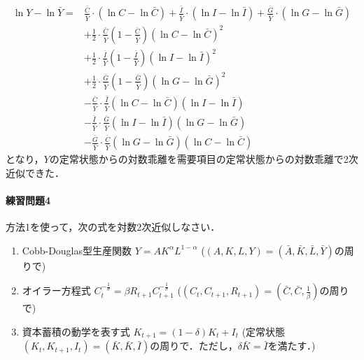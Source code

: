 \documentclass[a4paper,12pt,onecolumn,oneside,notitlepage,final]{article}
\begin{document}
\begin{itemize}
\begin{align*}
\ln Y - \ln \bar Y = &\frac{\bar C}{\bar Y}\cdot (\ln C - \ln \bar C) + \frac{\bar I}{\bar Y}\cdot (\ln I - \ln \bar I) + \frac{\bar G}{\bar Y}\cdot (\ln G - \ln \bar G) \\
&+ \frac{1}{2}\cdot \frac{\bar C}{\bar Y} \left(1-\frac{\bar C}{\bar Y}\right) (\ln C - \ln \bar C)^2 \\
&+ \frac{1}{2}\cdot \frac{\bar I}{\bar Y} \left(1-\frac{\bar I}{\bar Y}\right) (\ln I - \ln \bar I)^2 \\
&+ \frac{1}{2}\cdot \frac{\bar G}{\bar Y} \left(1-\frac{\bar G}{\bar Y}\right) (\ln G - \ln \bar G)^2 \\
&- \frac{\bar C}{\bar Y}\cdot \frac{\bar I}{\bar Y} (\ln C - \ln \bar C) (\ln I - \ln \bar I)\\
&- \frac{\bar I}{\bar Y}\cdot \frac{\bar G}{\bar Y} (\ln I - \ln \bar I) (\ln G - \ln \bar G)\\
&- \frac{\bar G}{\bar Y}\cdot \frac{\bar C}{\bar Y} (\ln G - \ln \bar G) (\ln C - \ln \bar C)
\end{align*}
となり，$Y$の定常状態からの対数乖離を需要項目の定常状態からの対数乖離で2次近似できた．
\end{itemize}


\paragraph{練習問題4} 方法1を使って，次の式を対数2次近似しなさい．
\begin{enumerate}
\item Cobb-Douglas型生産関数 $Y = AK^\alpha L^{1-\alpha}$ \quad ($(A,K,L,Y) = (\bar A, \bar K, \bar L, \bar Y)$の周りで)
\item オイラー方程式 $C_t^{-\frac{1}{\sigma}} = \beta R_{t+1} C_{t+1}^{-\frac{1}{\sigma}}$ \quad ($(C_t, C_{t+1}, R_{t+1}) = (\bar C, \bar C, \frac{1}{\beta})$の周りで)
\item 資本蓄積の動学を表す式 $K_{t+1} = (1-\delta) K_t + I_t$ (定常状態 $(K_t, K_{t+1}, I_t) = (\bar K, \bar K, \bar I)$の周りで．ただし，$\delta \bar K = \bar I$を満たす．)
\end{enumerate}
\end{document}
